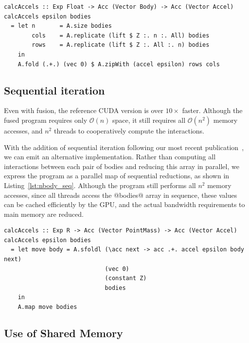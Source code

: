 \begin{lstlisting}[style=haskell_float
    ,label=lst:nbody
    ,caption={$N$-body gravitational simulation, using parallel reduction}]
calcAccels :: Exp Float -> Acc (Vector Body) -> Acc (Vector Accel)
calcAccels epsilon bodies
  = let n       = A.size bodies
        cols    = A.replicate (lift $ Z :. n :. All) bodies
        rows    = A.replicate (lift $ Z :. All :. n) bodies
    in
    A.fold (.+.) (vec 0) $ A.zipWith (accel epsilon) rows cols
\end{lstlisting}


\subsection{Sequential iteration}

Even with fusion, the reference CUDA version is over $10\times$ faster. Although
the fused program requires only $\mathcal{O}\left( n \right)$ space, it still
requires all $\mathcal{O}\left( n^2 \right)$ memory accesses, and $n^{2}$
threads to cooperatively compute the interactions.

With the addition of sequential iteration following our most recent
publication~\cite{McDonell:2013wi}, we can emit an alternative implementation.
Rather than computing all interactions between each pair of bodies and reducing
this array in parallel, we express the program as a parallel map of sequential
reductions, as shown in Listing~\ref{lst:nbody_seq}. Although the program still
performs all $n^{2}$ memory accesses, since all threads access the @bodies@
array in sequence, these values can be cached efficiently by the GPU, and the
actual bandwidth requirements to main memory are reduced.

\begin{lstlisting}[style=haskell_float
    ,label=lst:nbody_seq
    ,caption={$N$-body gravitational simulation, using sequential reduction}]
calcAccels :: Exp R -> Acc (Vector PointMass) -> Acc (Vector Accel)
calcAccels epsilon bodies
  = let move body = A.sfoldl (\acc next -> acc .+. accel epsilon body next)
                             (vec 0)
                             (constant Z)
                             bodies
    in
    A.map move bodies
\end{lstlisting}


\subsection{Use of Shared Memory}

